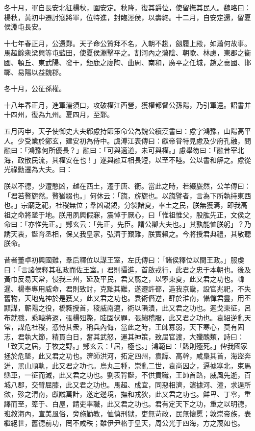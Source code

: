 \begin{pinyinscope}
冬十月，軍自長安北征楊秋，圍安定。秋降，復其爵位，使留撫其民人。魏略曰：楊秋，黃初中遷討寇將軍，位特進，封臨涇侯，以壽終。十二月，自安定還，留夏侯淵屯長安。

十七年春正月，公還鄴。天子命公贊拜不名，入朝不趨，劔履上殿，如蕭何故事。馬超餘衆梁興等屯藍田，使夏侯淵擊平之。割河內之蕩陰、朝歌、林慮，東郡之衞國、頓丘、東武陽、發干，鉅鹿之廮陶、曲周、南和，廣平之任城，趙之襄國、邯鄲、易陽以益魏郡。

冬十月，公征孫權。

十八年春正月，進軍濡須口，攻破權江西營，獲權都督公孫陽，乃引軍還。詔書并十四州，復為九州。夏四月，至鄴。

五月丙申，天子使御史大夫郗慮持節策命公為魏公續漢書曰：慮字鴻豫，山陽高平人。少受業於鄭玄，建安初為侍中。虞溥江表傳曰：獻帝甞特見慮及少府孔融，問融曰：「鴻豫何所優長？」融曰：「可與適道，未可與權。」慮舉笏曰：「融昔宰北海，政散民流，其權安在也！」遂與融互相長短，以至不睦。公以書和解之。慮從光祿勳遷為大夫。曰：

朕以不德，少遭愍凶，越在西土，遷于唐、衞。當此之時，若綴旒然，公羊傳曰：「君若贅旒然。贅猶綴也。」何休云：「旒，旂旒也。以旒譬者，言為下所執持東西也。」宗廟乏祀，社稷無位；羣凶覬覦，分裂諸夏，率土之民，朕無獲焉，即我高祖之命將墜于地。朕用夙興假寐，震悼于厥心，曰「惟祖惟父，股肱先正，文侯之命曰：「亦惟先正。」鄭玄云：「先正，先臣。謂公卿大夫也。」其孰能恤朕躬」？乃誘天衷，誕育丞相，保乂我皇家，弘濟于艱難，朕實賴之。今將授君典禮，其敬聽朕命。

昔者董卓初興國難，羣后釋位以謀王室，左氏傳曰：「諸侯釋位以間王政。」服虔曰：「言諸侯釋其私政而佐王室。」君則攝進，首啟戎行，此君之忠于本朝也。後及黃巾反易天常，侵我三州，延及平民，君又翦之，以寧東夏，此又君之功也。韓暹、楊奉專用威命，君則致討，克黜其難，遂遷許都，造我京畿，設官兆祀，不失舊物，天地鬼神於是獲乂，此又君之功也。袁術僭逆，肆於淮南，懾憚君靈，用丕顯謀，蘄陽之役，橋蕤授首，稜威南邁，術以隕潰，此又君之功也。迴戈東征，呂布就戮，乘轅將返，張楊殂斃，眭固伏罪，張繡稽服，此又君之功也。袁紹逆亂天常，謀危社稷，憑恃其衆，稱兵內侮，當此之時，王師寡弱，天下寒心，莫有固志，君執大節，精貫白日，奮其武怒，運其神策，致屆官渡，大殲醜類，詩曰：「致天之屆，于牧之野。」鄭玄云：「屆，極也。」鴻範曰：「鯀則殛死。」俾我國家拯於危墜，此又君之功也。濟師洪河，拓定四州，袁譚、高幹，咸梟其首，海盜奔迸，黑山順軌，此又君之功也。烏丸三種，崇亂二世，袁尚因之，逼據塞北，束馬縣車，一征而滅，此又君之功也。劉表背誕，不供貢職，王師首路，威風先逝，百城八郡，交臂屈膝，此又君之功也。馬超、成宜，同惡相濟，濵據河、潼，求逞所欲，殄之渭南，獻馘萬計，遂定邊境，撫和戎狄，此又君之功也。鮮卑、丁零，重譯而至，箄于、白屋，請吏率職，此又君之功也。君有定天下之功，重之以明德，班敘海內，宣美風俗，旁施勤教，恤慎刑獄，吏無苛政，民無懷慝；敦崇帝族，表繼絕世，舊德前功，罔不咸秩；雖伊尹格于皇天，周公光于四海，方之蔑如也。


\end{pinyinscope}
